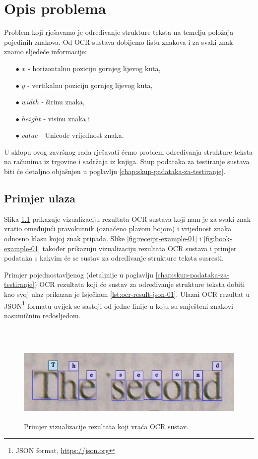\documentclass[times, utf8, zavrsni]{fer}
\begin{document}
\chapter{Opis problema}
Problem koji rješavamo je određivanje strukture teksta na temelju položaja pojedinih znakova.
Od OCR sustava dobijemo listu znakova i za svaki znak znamo sljedeće informacije:
\begin{itemize}
    \item[$\bullet$] $x$ - horizontalnu poziciju gornjeg lijevog kuta,
    \item[$\bullet$] $y$ - vertikalnu poziciju gornjeg lijevog kuta,
    \item[$\bullet$] $width$ - širinu znaka,
    \item[$\bullet$] $height$ - visinu znaka i
    \item[$\bullet$] $value$ - Unicode vrijednost znaka.
\end{itemize}

U sklopu ovog završnog rada rješavati ćemo problem određivanja strukture teksta
na računima iz trgovine i sadržaja iz knjiga. Stup podataka za testiranje
sustava biti će detaljno objašnjen u poglavlju \ref{chap:skup-padataka-za-testiranje}.

\section{Primjer ulaza}

Slika \ref{fig:book-example-02} prikazuje vizualizaciju rezultata OCR sustava koji nam je za svaki
znak vratio omeđujući pravokutnik (označeno plavom bojom) i vrijednost znaka odnosno klasu kojoj
znak pripada. Slike \ref{fig:receipt-example-01} i \ref{fig:book-example-01} također prikazuju
vizualizaciju rezultata OCR sustava i primjer podataka s kakvim će se sustav za
određivanje strukture teksta susresti.

Primjer pojednostavljenog (detaljnije u poglavlju \ref{chap:skup-padataka-za-testiranje}) OCR rezultata koji će sustav za određivanje strukture teksta dobiti kao svoj
ulaz prikazan je Isječkom \ref{lst:ocr-result-json-01}. Ulazni OCR rezultat u JSON\footnote{JSON format, \url{https://json.org}}
formatu uvijek se sastoji od jedne linije u koju su smješteni znakovi nasumičnim redosljedom.

\

\begin{figure}[htb]
    \centering
    \includegraphics[height=4cm]{images/book-example-02.png}
    \caption{Primjer vizualizacije rezultata koji vraća OCR sustav.}
    \label{fig:book-example-02}
\end{figure}
\end{document}
